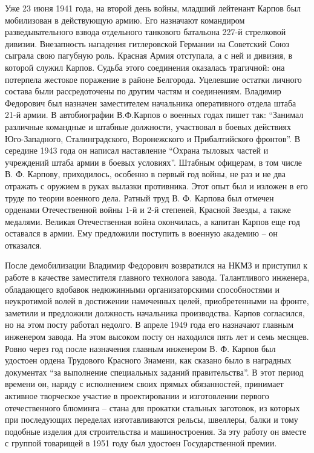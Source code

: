 Уже 23 июня 1941 года, на второй день войны, младший лейтенант Карпов был
мобилизован в действующую армию. Его назначают командиром разведывательного
взвода отдельного танкового батальона 227-й стрелковой дивизии. Внезапность
нападения гитлеровской Германии на Советский Союз сыграла свою пагубную роль.
Красная Армия отступала, а с ней и дивизия, в которой служил Карпов. Судьба
этого соединения оказалась трагичной: она потерпела жестокое поражение в районе
Белгорода. Уцелевшие остатки личного состава были рассредоточены по другим
частям и соединениям. Владимир Федорович был назначен заместителем начальника
оперативного отдела штаба 21-й армии. В автобиографии В.Ф.Карпов о военных
годах пишет так: \enquote{Занимал различные командные и штабные должности, участвовал в
боевых действиях Юго-Западного, Сталинградского, Воронежского и Прибалтийского
фронтов}. В середине 1943 года  он написал наставление \enquote{Охрана тыловых частей и
учреждений штаба армии в боевых условиях}. Штабным офицерам, в том числе
В. Ф. Карпову, приходилось, особенно в первый год войны, не раз и не два отражать
с оружием в руках вылазки противника. Этот опыт был и изложен в его труде по
теории военного дела. Ратный труд В. Ф. Карпова был отмечен орденами
Отечественной войны 1-й и 2-й степеней, Красной Звезды, а также медалями.
Великая Отечественная война окончилась, а капитан Карпов еще год оставался в
армии. Ему предложили поступить в военную академию – он отказался.

После демобилизации Владимир Федорович возвратился на НКМЗ и приступил к работе
в качестве заместителя главного технолога завода. Талантливого инженера,
обладающего вдобавок недюжинными организаторскими способностями и неукротимой
волей в достижении намеченных целей, приобретенными на фронте, заметили и
предложили должность начальника производства. Карпов согласился, но на этом
посту работал недолго. В апреле 1949 года его назначают главным инженером
завода. На этом высоком посту он находился пять лет и семь месяцев. Ровно через
год после назначения главным инженером В. Ф. Карпов был удостоен ордена Трудового
Красного Знамени, как сказано было в наградных документах \enquote{за выполнение
специальных заданий правительства}. В этот период времени он, наряду с
исполнением своих прямых обязанностей, принимает активное творческое участие в
проектировании и изготовлении первого отечественного блюминга – стана для
прокатки стальных заготовок, из которых при последующих переделах
изготавливаются рельсы, швеллеры, балки и тому подобные изделия для
строительства и машиностроения. За эту работу он вместе с группой товарищей в
1951 году был удостоен Государственной премии.

